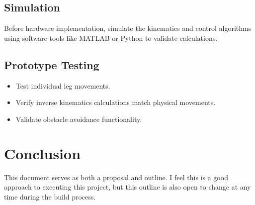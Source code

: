 \documentclass{article}
\begin{document}
\subsection{Simulation}

Before hardware implementation, simulate the kinematics and control algorithms using software tools like MATLAB or Python to validate calculations.

\subsection{Prototype Testing}

\begin{itemize}
    \item Test individual leg movements.
    \item Verify inverse kinematics calculations match physical movements.
    \item Validate obstacle avoidance functionality.
\end{itemize}

\section{Conclusion}

This document serves as both a proposal and outline. I feel this is a good approach to executing this project, but this outline is also open to change at any time during the build process.
\end{document}
